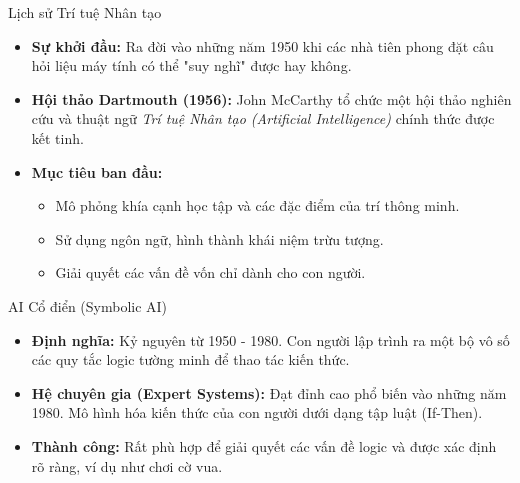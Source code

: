 \documentclass[aspectratio=169]{beamer}
\begin{document}
\begin{frame}{Lịch sử Trí tuệ Nhân tạo}
    \begin{itemize}
        \item \textbf{Sự khởi đầu:} Ra đời vào những năm 1950 khi các nhà tiên phong đặt câu hỏi liệu máy tính có thể "suy nghĩ" được hay không.
        \item \textbf{Hội thảo Dartmouth (1956):} John McCarthy tổ chức một hội thảo nghiên cứu và thuật ngữ \textit{Trí tuệ Nhân tạo (Artificial Intelligence)} chính thức được kết tinh.
        \item \textbf{Mục tiêu ban đầu:}
        \begin{itemize}
            \item Mô phỏng khía cạnh học tập và các đặc điểm của trí thông minh.
            \item Sử dụng ngôn ngữ, hình thành khái niệm trừu tượng.
            \item Giải quyết các vấn đề vốn chỉ dành cho con người.
        \end{itemize}
    \end{itemize}
\end{frame}

\begin{frame}{AI Cổ điển (Symbolic AI)}
    \begin{itemize}
        \item \textbf{Định nghĩa:} Kỷ nguyên từ 1950 - 1980. Con người lập trình ra một bộ vô số các quy tắc logic tường minh để thao tác kiến thức.
        \item \textbf{Hệ chuyên gia (Expert Systems):} Đạt đỉnh cao phổ biến vào những năm 1980. Mô hình hóa kiến thức của con người dưới dạng tập luật (If-Then).
        \item \textbf{Thành công:} Rất phù hợp để giải quyết các vấn đề logic và được xác định rõ ràng, ví dụ như chơi cờ vua.
    \end{itemize}
\end{frame}
\end{document}

